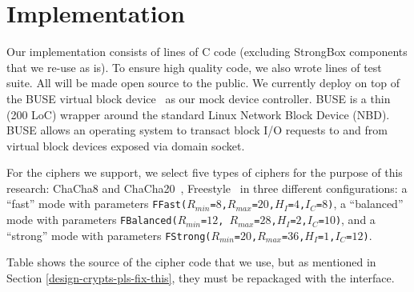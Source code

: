 \section{Implementation}\label{subsec:implementation}

Our \sys implementation consists of \locTotal lines of C code (excluding
StrongBox components that we re-use as is). To ensure high quality code, we also
wrote \locTest lines of test suite. All will be made open source to the public.
We currently deploy \sys on top of the BUSE virtual block device~\cite{BUSE} as
our mock device controller. BUSE is a thin (200 LoC) wrapper around the standard
Linux Network Block Device (NBD). BUSE allows an operating system to transact
block I/O requests to and from virtual block devices exposed via domain socket.



For the ciphers we support, we select five types of ciphers for the purpose of
this research: ChaCha8 and ChaCha20~\cite{ChaCha20}, Freestyle~\cite{Freestyle}
in three different configurations: a ``fast'' mode with parameters
\texttt{FFast($R_{min}$=$8$,$R_{max}$=$20$,$H_I$=$4$,$I_C$=$8$)}, a ``balanced''
mode with parameters \texttt{FBalanced($R_{min}$=$12$,
$R_{max}$=$28$,$H_I$=$2$,$I_C$=$10$)}, and a ``strong'' mode with parameters
\texttt{FStrong($R_{min}$=$20$,$R_{max}$=$36$,$H_I$=$1$,$I_C$=$12$)}. 

Table  shows the source of the cipher code that we use, but as
mentioned in Section \ref{design-crypts-pls-fix-this}, they must be repackaged
with the \sysB interface.

